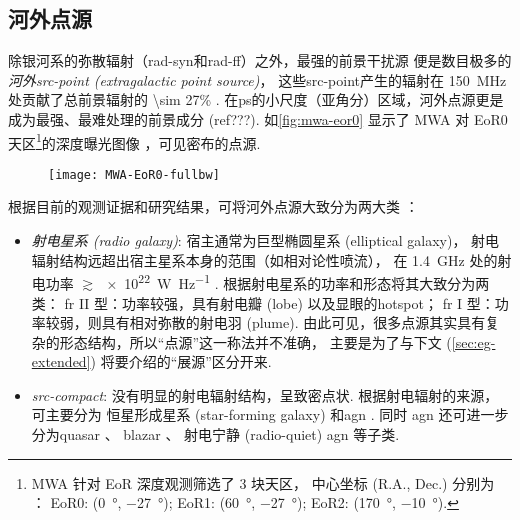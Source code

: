 \subsection{河外点源}

除银河系的弥散辐射（\ac{rad-syn}和\ac{rad-ff}）之外，最强的前景干扰源
便是数目极多的\emph{河外\acs{src-point} (extragalactic point source)}，
这些\ac{src-point}产生的辐射在 \SI{150}{\MHz} 处贡献了总前景辐射的
\num{\sim 27}\% \cite{shaver1999}.
在\ac{ps}的小尺度（亚角分）区域，河外点源更是成为最强、最难处理的前景成分 (ref???).
如\autoref{fig:mwa-eor0} 显示了 MWA 对 EoR0 天区\footnote{%
  MWA 针对 EoR 深度观测筛选了 3 块天区，
  中心坐标 (R.A., Dec.\@) 分别为 \cite{beardsley2016}：
  EoR0: (\SI{0}{\degree}, \SI{-27}{\degree});
  EoR1: (\SI{60}{\degree}, \SI{-27}{\degree});
  EoR2: (\SI{170}{\degree}, \SI{-10}{\degree}).
}的深度曝光图像 \cite{offringa2016}，可见密布的点源.

\begin{figure}[htp]
  \centering
  \texttt{[image: MWA-EoR0-fullbw]}
  \label{fig:mwa-eor0}
\end{figure}

根据目前的观测证据和研究结果，可将河外点源大致分为两大类 \cite{padovani2016}：
\begin{itemize}
  \item \emph{射电星系 (radio galaxy)}:
    宿主通常为巨型椭圆星系 (elliptical galaxy)，
    射电辐射结构远超出宿主星系本身的范围（如相对论性喷流），
    在 \SI{1.4}{\GHz} 处的射电功率 $\gtrsim$\,\SI{e22}{\watt\per\hertz}
    \cite{ledlow1996}.
     根据射电星系的功率和形态将其大致分为两类：
    \ac{fr} II 型：功率较强，具有射电瓣 (lobe) 以及显眼的\ac{hotspot}；
    \ac{fr} I 型：功率较弱，则具有相对弥散的射电羽 (plume).
    由此可见，很多点源其实具有复杂的形态结构，所以\enquote{点源}这一称法并不准确，
    主要是为了与下文 (\autoref{sec:eg-extended})
    将要介绍的\enquote{展源}区分开来.

  \item \emph{\ac{src-compact}}:
    没有明显的射电辐射结构，呈致密点状.
    根据射电辐射的来源，可主要分为
    恒星形成星系 (star-forming galaxy) \cite{condon1992}
    和\ac{agn} \cite{urry1995,antonucci1993,padovani2017}.
    同时 \ac{agn} 还可进一步分为\ac{quasar} \cite{barthel1989,antonucci1993}、
    \ac{blazar} \cite{giommi2012,giommi2013}、
    射电宁静 (radio-quiet) \ac{agn} \cite{sandage1965,wilson1995} 等子类.
\end{itemize}

